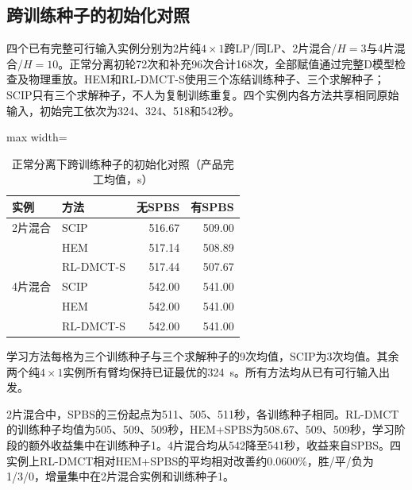 \subsection{跨训练种子的初始化对照}\label{sec:journal-training-cn}
四个已有完整可行输入实例分别为2片纯$4\times1$跨LP/同LP、2片混合/$H=3$与4片混合/$H=10$。正常分离初轮72次和补充96次合计168次，全部赋值通过完整D模型检查及物理重放。HEM和RL-DMCT-S使用三个冻结训练种子、三个求解种子；SCIP只有三个求解种子，不人为复制训练重复。四个实例内各方法共享相同原始输入，初始完工依次为324、324、518和542秒。
\begin{table}[!htbp]
\centering\small
\caption{正常分离下跨训练种子的初始化对照（产品完工均值，s）}
\label{tab:journal-training-cn}
\begin{adjustbox}{max width=\linewidth}
\begin{tabular}{llrr}\toprule
实例 & 方法 & 无SPBS & 有SPBS\\\midrule
2片混合 & SCIP & 516.67 & 509.00\\
 & HEM & 517.14 & 508.89\\
 & RL-DMCT-S & 517.44 & 507.67\\
4片混合 & SCIP & 542.00 & 541.00\\
 & HEM & 542.00 & 541.00\\
 & RL-DMCT-S & 542.00 & 541.00\\
\bottomrule\end{tabular}
\end{adjustbox}
\par\smallskip\footnotesize 学习方法每格为三个训练种子与三个求解种子的9次均值，SCIP为3次均值。其余两个纯$4\times1$实例所有臂均保持已证最优的324~s。所有方法均从已有可行输入出发。
\end{table}
2片混合中，SPBS的三份起点为511、505、511秒，各训练种子相同。RL-DMCT的训练种子均值为505、509、509秒，HEM+SPBS为508.67、509、509秒，学习阶段的额外收益集中在训练种子1。4片混合均从542降至541秒，收益来自SPBS。四实例上RL-DMCT相对HEM+SPBS的平均相对改善约0.0600\%，胜/平/负为1/3/0，增量集中在2片混合实例和训练种子1。
